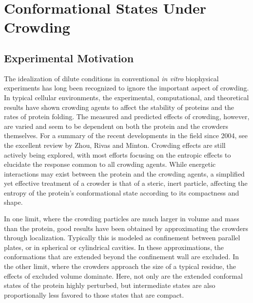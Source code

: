 \chapter{Conformational States Under Crowding}
\label{chap:WL_crowding}

\section{Experimental Motivation \label{sec:intro}}

The idealization of dilute conditions in conventional \textit{in vitro} biophysical experiments has long been recognized to ignore the important aspect of crowding. In typical cellular environments, the experimental, computational, and theoretical results have shown crowding agents to affect the stability of proteins and the rates of protein folding. The measured and predicted effects of crowding, however, are varied and seem to be dependent on both the protein and the crowders themselves. For a summary of the recent developments in the field since 2004, see the excellent review by Zhou, Rivas and Minton.\cite{zhou_macromolecular_2008} Crowding effects are still actively being explored, with most efforts focusing on the entropic effects to elucidate the response common to all crowding agents. While energetic interactions may exist between the protein and the crowding agents, a simplified yet effective treatment of a crowder is that of a steric, inert particle, affecting the entropy of the protein's conformational state according to its compactness and shape.\cite{hoppe_entropic_2009, homouz_crowded_2008}

In one limit, where the crowding particles are much larger in volume and mass than the protein, good results have been obtained by approximating the crowders through localization. Typically this is modeled as confinement between parallel plates, or in spherical or cylindrical cavities.\cite{mittal_thermodynamics_2008, wang_confinement_2009, zhou_stabilization_2001} In these approximations, the conformations that are extended beyond the confinement wall are excluded. In the other limit, where the crowders approach the size of a typical residue, the effects of excluded volume dominate. Here, not only are the extended conformal states of the protein highly perturbed, but intermediate states are also proportionally less favored to those states that are compact.\cite{minton_effect_2000}

